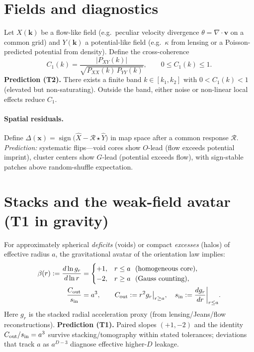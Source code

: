 \documentclass[12pt,a4paper,oneside]{scrreprt}
\begin{document}
\section{Fields and diagnostics}\label{sec:lss-fields}
Let $X(\mathbf k)$ be a flow-like field (e.g.\ peculiar velocity divergence $\theta=\nabla\!\cdot\mathbf v$ on a common grid) and $Y(\mathbf k)$ a potential-like field (e.g.\ $\kappa$ from lensing or a Poisson-predicted potential from density). 
Define the cross-coherence
\begin{equation}
C_1(k)=\frac{|P_{XY}(k)|}{\sqrt{P_{XX}(k)\,P_{YY}(k)}},\qquad 0\le C_1(k)\le 1.
\end{equation}
\textbf{Prediction (T2).} There exists a finite band $k\in[k_1,k_2]$ with $0<C_1(k)<1$ (elevated but non-saturating). 
Outside the band, either noise or non-linear local effects reduce $C_1$.

\paragraph{Spatial residuals.}
Define $\Delta(\mathbf x)=\operatorname{sign}\big(\widehat X - \mathcal R\star \widehat Y\big)$ in map space after a common response $\mathcal R$.
\emph{Prediction:} systematic flips—void cores show $O$-lead (flow exceeds potential imprint), cluster centers show $G$-lead (potential exceeds flow), with sign-stable patches above random-shuffle expectation.

\section{Stacks and the weak-field avatar (T1 in gravity)}\label{sec:lss-stacks}
For approximately spherical \emph{deficits} (voids) or compact \emph{excesses} (halos) of effective radius $a$, the gravitational avatar of the orientation law implies:
\begin{align}
\beta(r) := \frac{d\ln g_r}{d\ln r} &= 
\begin{cases}
+1,& r\le a \ \ (\text{homogeneous core}),\\
-2,& r\ge a \ \ (\text{Gauss counting}),
\end{cases}\\
\frac{C_{\rm out}}{s_{\rm in}} &= a^{3},\qquad 
C_{\rm out}:=r^2 g_r\big|_{r\ge a},\quad 
s_{\rm in}:=\frac{dg_r}{dr}\bigg|_{r\le a}.
\end{align}
Here $g_r$ is the stacked radial acceleration proxy (from lensing/Jeans/flow reconstructions).
\textbf{Prediction (T1).} Paired slopes $(+1,-2)$ and the identity $C_{\rm out}/s_{\rm in}=a^3$ survive stacking/tomography within stated tolerances; deviations that track $a$ as $a^{D-3}$ diagnose effective higher-$D$ leakage.
\end{document}
